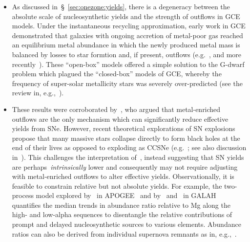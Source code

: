 \documentclass[ms.tex]{subfiles}
\begin{document}
\begin{itemize}

	\item As discussed in~\S~\ref{sec:onezone:yields}, there is a
	degeneracy between the absolute scale of nucleosynthetic yields and the
	strength of outflows in GCE models.
	Under the instantaneous recycling approximation, early work in GCE
	demonstrated that galaxies with ongoing accretion of metal-poor gas
	reached an equilibrium metal abundance in which the newly produced metal
	mass is balanced by losses to star formtion and, if present, outflows
	(e.g.~\citealp{Larson1972}, and more recently~\citealp{Weinberg2017}).
	These ``open-box'' models offered a simple solution to the G-dwarf problem
	which plagued the ``closed-box'' models of GCE, whereby the frequency of
	super-solar metallicity stars was severely over-predicted (see the review
	in, e.g.,~\citealp{Tinsley1980}).

	\item These results were corroborated by~\citet{Dalcanton2007}, who argued
	that metal-enriched outflows are the only mechanism which can
	significantly reduce effective yields from SNe.
	However, recent theoretical explorations of SN explosions propose that
	many massive stars collapse directly to form black holes at the end of
	their lives as opposed to exploding as CCSNe (e.g.~\citealp{Ertl2016,
	Sukhbold2016}; see also discussion in~\citealp{Griffith2021}).
	This challenges the interpretation of~\citet{Dalcanton2007}, instead
	suggesting that SN yields are perhaps~\textit{intrinsically} lower and
	consequently may not require adjusting with metal-enriched outflows to
	alter effective yields.
	Observationally, it is feasible to constrain relative but not absolute
	yields.
	For example, the two-process model explored by~\citet{Weinberg2019,
	Weinberg2021} in APOGEE~\citep{Majewski2017} and by~\citet*{Griffith2019}
	and~\citet{Griffith2022} in GALAH~\citep{DeSilva2015, Martell2017}
	quantifies the median trends in abundance ratio relative to Mg along the
	high- and low-alpha sequences to disentangle the relative contributions of
	prompt and delayed nucleosynthetic sources to various elements.
	Abundance ratios can also be derived from individual supernova remnants as
	in, e.g.,~\citet*{Holland-Ashford2020}.


\end{itemize}
\end{document}
